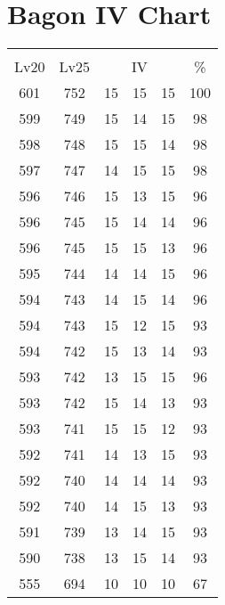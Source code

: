 \documentclass{article}%
\begin{document}
%
\normalsize%
\section{Bagon IV Chart}%
\label{sec:Bagon IV Chart}%
\renewcommand{\arraystretch}{1.5}%
\begin{tabular}{|c|c|c|c|c|c|}%
\hline%
\multicolumn{6}{|c|}{\textcolor{white}{ 
\linebreak{Bagon}
}%
\cellcolor{black}}\\%
\multicolumn{1}{|c}{Lv20}&\multicolumn{1}{c|}{Lv25}&\multicolumn{3}{c|}{IV}&\multicolumn{1}{|c|}{\%}\\%
\hline%
\rowcolor{color100}%
601&752&15&15&15&100\\%
\hline%
\rowcolor{color98}%
599&749&15&14&15&98\\%
\hline%
\rowcolor{color98}%
598&748&15&15&14&98\\%
\hline%
\rowcolor{color98}%
597&747&14&15&15&98\\%
\hline%
\rowcolor{color96}%
596&746&15&13&15&96\\%
\hline%
\rowcolor{color96}%
596&745&15&14&14&96\\%
\hline%
\rowcolor{color96}%
596&745&15&15&13&96\\%
\hline%
\rowcolor{color96}%
595&744&14&14&15&96\\%
\hline%
\rowcolor{color96}%
594&743&14&15&14&96\\%
\hline%
\rowcolor{color93}%
594&743&15&12&15&93\\%
\hline%
\rowcolor{color93}%
594&742&15&13&14&93\\%
\hline%
\rowcolor{color96}%
593&742&13&15&15&96\\%
\hline%
\rowcolor{color93}%
593&742&15&14&13&93\\%
\hline%
\rowcolor{color93}%
593&741&15&15&12&93\\%
\hline%
\rowcolor{color93}%
592&741&14&13&15&93\\%
\hline%
\rowcolor{color93}%
592&740&14&14&14&93\\%
\hline%
\rowcolor{color93}%
592&740&14&15&13&93\\%
\hline%
\rowcolor{color93}%
591&739&13&14&15&93\\%
\hline%
\rowcolor{color93}%
590&738&13&15&14&93\\%
\hline%
\rowcolor{color91}%
555&694&10&10&10&67\\%
\end{tabular}

%
\end{document}
